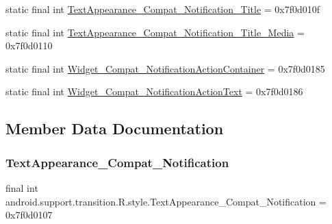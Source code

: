 \begin{DoxyCompactItemize}
\item 
static final int \mbox{\hyperlink{classandroid_1_1support_1_1transition_1_1R_1_1style_a5dc9f3af6958a0eb767c72172ed23178}{Text\+Appearance\+\_\+\+Compat\+\_\+\+Notification\+\_\+\+Title}} = 0x7f0d010f
\item 
static final int \mbox{\hyperlink{classandroid_1_1support_1_1transition_1_1R_1_1style_a2b139d543dc2d30d3868c2bc29ef99c1}{Text\+Appearance\+\_\+\+Compat\+\_\+\+Notification\+\_\+\+Title\+\_\+\+Media}} = 0x7f0d0110
\item 
static final int \mbox{\hyperlink{classandroid_1_1support_1_1transition_1_1R_1_1style_a676a5867d0b83e22c08c1e8bb4da1827}{Widget\+\_\+\+Compat\+\_\+\+Notification\+Action\+Container}} = 0x7f0d0185
\item 
static final int \mbox{\hyperlink{classandroid_1_1support_1_1transition_1_1R_1_1style_af434cc5b5905a9b477e4ba7fb6c0ba54}{Widget\+\_\+\+Compat\+\_\+\+Notification\+Action\+Text}} = 0x7f0d0186
\end{DoxyCompactItemize}


\subsection{Member Data Documentation}
\mbox{\label{classandroid_1_1support_1_1transition_1_1R_1_1style_ae96b82f217c7c9c896b2ade781c0a3bc}} 
\subsubsection{\texorpdfstring{Text\+Appearance\+\_\+\+Compat\+\_\+\+Notification}{TextAppearance\_Compat\_Notification}}
{\footnotesize\ttfamily final int android.\+support.\+transition.\+R.\+style.\+Text\+Appearance\+\_\+\+Compat\+\_\+\+Notification = 0x7f0d0107\hspace{0.3cm}{\ttfamily [static]}}

\mbox{\label{classandroid_1_1support_1_1transition_1_1R_1_1style_a4ab9fe59305f96da76de5fd9adee7571}} 
